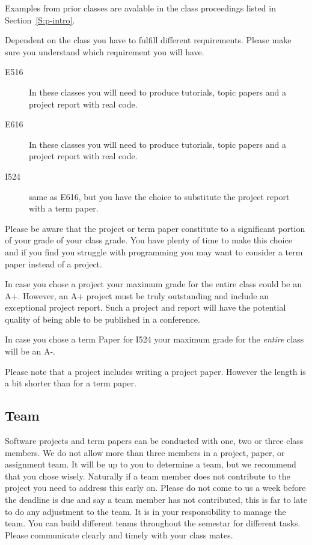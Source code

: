Examples from prior classes are avalable in the class proceedings
listed in Section~\ref{S:p-intro}.

Dependent on the class you have to fulfill different
requirements. Please make sure you understand which requirement you
will have.

\begin{description}

\item[E516] In these classes you will need to produce
  tutorials, topic papers and a project report with real code.

\item[E616] In these classes you will need to produce
  tutorials, topic papers and a project report with real code. 

\item[I524] same as E616, but you have the choice to
  substitute the project report with a term paper.

\end{description}

Please be aware that the project or term paper constitute to a
significant portion of your grade of your class grade. You have plenty
of time to make this choice and if you find you struggle with
programming you may want to consider a term paper instead of a
project.

In case you chose a project your maximum grade for the entire class
could be an A+. However, an A+ project must be truly outstanding and
include an exceptional project report. Such a project and report will
have the potential quality of being able to be published in a
conference.

In case you chose a term Paper for I524 your maximum grade for the
\textit{entire} class will be an A-.

Please note that a project includes writing a project paper.  However
the length is a bit shorter than for a term paper.

\subsection{Team}

Software projects and term papers can be conducted with one, two or
three class members. We do not allow more than three members in a
project, paper, or assignment team. It will be up to you to determine
a team, but we recommend that you chose wisely. Naturally if a team
member does not contribute to the project you need to address this
early on. Please do not come to us a week before the deadline is due
and say a team member has not contributed, this is far to late to do
any adjustment to the team. It is in your responsibility to manage the
team. You can build different teams throughout the semestar for
different tasks. Please communicate clearly and timely with your
class mates.

